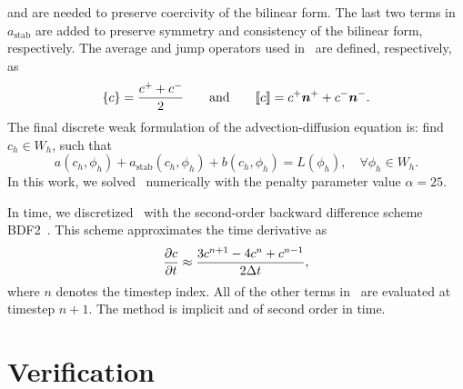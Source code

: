 \documentclass{WileyMSP-template}
\begin{document}
and are needed to preserve coercivity of the bilinear form.
The last two terms in $a_{\mathrm{stab}}$ are
added to preserve symmetry and consistency of the bilinear form, respectively.
The average and jump operators used
in~ are defined, respectively, as
\begin{equation*}
    \{c\} = \frac{c^+ + c^-}{2} \qquad\mathrm{and}\qquad \llbracket c\rrbracket = c^+\bm{n}^+ + c^-\bm{n}^-.
\end{equation*}
The final discrete weak formulation of the advection-diffusion equation is:
find $c_h\in W_h$, such that
\begin{equation}
    a(c_h, \phi_h) + a_{\mathrm{stab}}(c_h, \phi_h) + b(c_h, \phi_h) = L(\phi_h),
    \quad\forall\phi_h\in W_h.
    \label{eq:discrete_weak_form_adv_diff}
\end{equation}
In this work, we solved~ numerically
with the penalty parameter value $\alpha=25$.

In time, we discretized~ with the
second-order backward difference scheme BDF2~\cite{Volker2016}. This scheme
approximates the time derivative as
\begin{equation*}
    \frac{\partial c}{\partial t} \approx \frac{3c^{n+1} - 4c^n + c^{n-1}}{2\Delta t},
\end{equation*}
where $n$ denotes the timestep index. All of the other terms
in~ are evaluated at timestep $n+1$.
The method is implicit and of second order in time.

\section{Verification}\label{sec:appB_verification}
\end{document}
